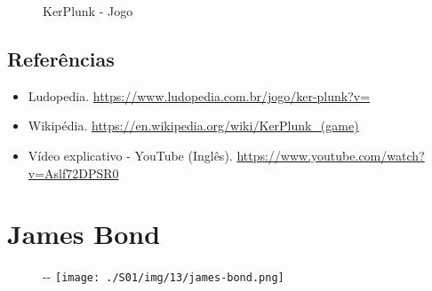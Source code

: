 \begin{figure}
  \centering
    \caption{KerPlunk - Jogo\label{fig:ker-plunk-jogo}}
\end{figure}

\hypertarget{referuxeancias-1}{%
\subsection{Referências}\label{referuxeancias-1}}

\begin{itemize}
\tightlist
\item
  \sloppy Ludopedia. \url{https://www.ludopedia.com.br/jogo/ker-plunk?v=}
\item
  \sloppy Wikipédia. \url{https://en.wikipedia.org/wiki/KerPlunk_(game)}
\item
  \sloppy Vídeo explicativo - YouTube (Inglês). \url{https://www.youtube.com/watch?v=Aslf72DPSR0}
\end{itemize}

\hypertarget{james-bond}{%
\section{James Bond}\label{james-bond}}

\begin{figure}[!ht]
  \begin{adjustwidth}{-\oddsidemargin-1in}{-\rightmargin}
    \centering
    \texttt{[image: ./S01/img/13/james-bond.png]}
  \end{adjustwidth}
\end{figure}

